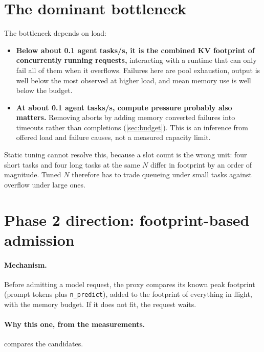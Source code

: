 \section{The dominant bottleneck}\label{sec:bottleneck}

The bottleneck depends on load:
\begin{itemize}
  \item \textbf{Below about 0.1 agent tasks/s, it is the combined KV footprint of concurrently running requests,} interacting with a runtime that can only fail all of them when it overflows. Failures here are pool exhaustion, output is well below the most observed at higher load, and mean memory use is well below the budget.
  \item \textbf{At about 0.1 agent tasks/s, compute pressure probably also matters.} Removing aborts by adding memory converted failures into timeouts rather than completions (\cref{sec:budget}). This is an inference from offered load and failure causes, not a measured capacity limit.
\end{itemize}

Static tuning cannot resolve this, because a slot count is the wrong unit: four short tasks and four long tasks at the same $N$ differ in footprint by an order of magnitude. Tuned $N$ therefore has to trade queueing under small tasks against overflow under large ones.

\section{Phase 2 direction: footprint-based admission}\label{sec:phase2}

\paragraph{Mechanism.} Before admitting a model request, the proxy compares its known peak footprint (prompt tokens plus \texttt{n\_predict}), added to the footprint of everything in flight, with the memory budget. If it does not fit, the request waits.

\paragraph{Why this one, from the measurements.}  compares the candidates.

